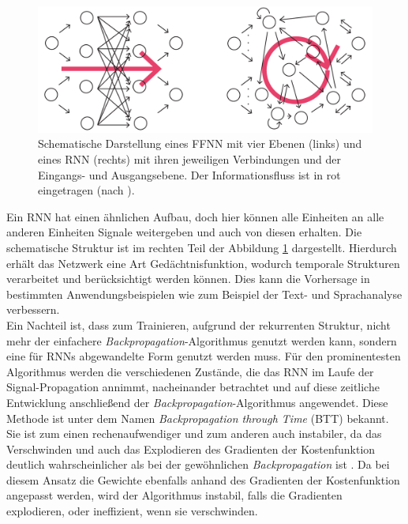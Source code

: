 \begin{figure}[H]
    \centering
    \includegraphics[width = 0.9 \textwidth]{figures/illustrations/ffnn_rnn_structure.pdf}
    \caption{Schematische Darstellung eines \textsc{FFNN} mit vier Ebenen (links) und eines \textsc{RNN} (rechts) mit ihren jeweiligen Verbindungen und der Eingangs- und Ausgangsebene. Der Informationsfluss ist in rot eingetragen (nach \citep{jeagerTut2002}).}
    \label{fig:ffnn_rnn_structure}
\end{figure}

Ein \textsc{RNN} hat einen ähnlichen Aufbau, doch hier können alle Einheiten an alle anderen Einheiten Signale weitergeben und auch von diesen erhalten. Die schematische Struktur ist im rechten Teil der Abbildung \ref{fig:ffnn_rnn_structure} dargestellt. Hierdurch erhält das Netzwerk eine Art Gedächtnisfunktion, wodurch temporale Strukturen verarbeitet und berücksichtigt werden können. Dies kann die Vorhersage in bestimmten Anwendungsbeispielen wie zum Beispiel der Text- und Sprachanalyse verbessern.\\
Ein Nachteil ist, dass zum Trainieren, aufgrund der rekurrenten Struktur, nicht mehr der einfachere \textit{Backpropagation}-Algorithmus genutzt werden kann, sondern eine für \textsc{RNN}s abgewandelte Form genutzt werden muss. Für den prominentesten Algorithmus werden die verschiedenen Zustände, die das \textsc{RNN} im Laufe der Signal-Propagation annimmt, nacheinander betrachtet und auf diese zeitliche Entwicklung anschließend der \textit{Backpropagation}-Algorithmus angewendet. Diese Methode ist unter dem Namen \textit{Backpropagation through Time} (BTT) bekannt. Sie ist zum einen rechenaufwendiger und zum anderen auch instabiler, da das Verschwinden und auch das Explodieren des Gradienten der Kostenfunktion deutlich wahrscheinlicher als bei der gewöhnlichen \textit{Backpropagation} ist \citep{pascanu, jeagerTut2002}. Da bei diesem Ansatz die Gewichte ebenfalls anhand des Gradienten der Kostenfunktion angepasst werden, wird der Algorithmus instabil, falls die Gradienten explodieren, oder ineffizient, wenn sie verschwinden.
